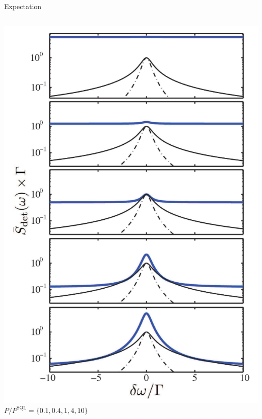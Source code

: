 \documentclass{beamer}
\begin{document}
\begin{frame}{Expectation}
\begin{columns}
		\small\centering
		\includegraphics[width=\textwidth]{figures/3.5.png}
		$P/P^\text{SQL} = \{0.1, 0.4, 1, 4, 10\}$
	\end{columns}
\end{frame}
\end{document}

